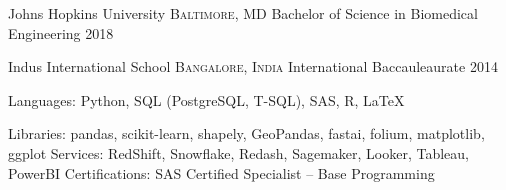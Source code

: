 \documentclass[10pt,a4paper]{article}
\begin{document}
\spacedhrule{0.9em}{-0.4em}


\headedsection
  {{Johns Hopkins University}}
  {\textsc{Baltimore, MD}} {%
  \headedsubsection
    {Bachelor of Science in Biomedical Engineering}
    {2018}
    {}
}

\headedsection
  {{Indus International School}}
  {\textsc{Bangalore, India}} {%
  \headedsubsection
    {International Baccauleaurate} %
    {2014} {}
}


\spacedhrule{0.5em}{-0.4em}


\inlineheadsection  %
  {Languages:}
  {Python, SQL (PostgreSQL, T-SQL), SAS, R, \LaTeX}

\inlineheadsection
  {Libraries:}
  {pandas, scikit-learn, shapely, GeoPandas, fastai, folium, matplotlib, ggplot}
\inlineheadsection
  {Services:}
  { RedShift, Snowflake, Redash,  Sagemaker, Looker, Tableau, PowerBI}
\inlineheadsection
  {Certifications:}
  {SAS Certified Specialist -- Base Programming}


\end{document}
